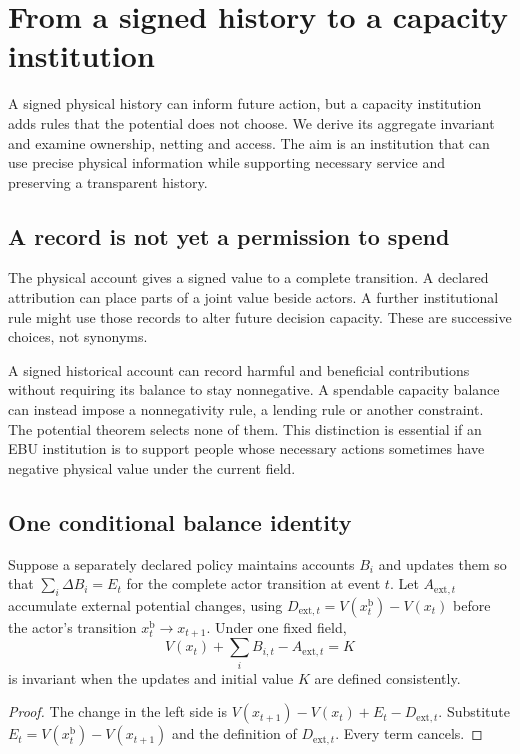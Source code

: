 \chapter{From a signed history to a capacity institution}\label{ch:institutions}

A signed physical history can inform future action, but a capacity institution adds rules that the potential does not choose. We derive its aggregate invariant and examine ownership, netting and access. The aim is an institution that can use precise physical information while supporting necessary service and preserving a transparent history.


\section{A record is not yet a permission to spend}
The physical account gives a signed value to a complete transition. A declared attribution can place parts of a joint value beside actors. A further institutional rule might use those records to alter future decision capacity. These are successive choices, not synonyms.

A signed historical account can record harmful and beneficial contributions without requiring its balance to stay nonnegative. A spendable capacity balance can instead impose a nonnegativity rule, a lending rule or another constraint. The potential theorem selects none of them. This distinction is essential if an EBU institution is to support people whose necessary actions sometimes have negative physical value under the current field.

\section{One conditional balance identity}
Suppose a separately declared policy maintains accounts $B_i$ and updates them so that $\sum_i\Delta B_i=E_t$ for the complete actor transition at event $t$. Let $A_{{\mathrm{ext}},t}$ accumulate external potential changes, using
$D_{{\mathrm{ext}},t}=V(x^{\mathrm{b}}_t)-V(x_t)$ before the actor's transition $x^{\mathrm{b}}_t\to x_{t+1}$. Under one fixed field,
\begin{equation}\label{eq:capacity-invariant}
 V(x_t)+\sum_iB_{i,t}-A_{{\mathrm{ext}},t}=K
\end{equation}
is invariant when the updates and initial value $K$ are defined consistently.

\begin{proof}
The change in the left side is
$V(x_{t+1})-V(x_t)+E_t-D_{{\mathrm{ext}},t}$.
Substitute $E_t=V(x^{\mathrm{b}}_t)-V(x_{t+1})$ and the definition of $D_{{\mathrm{ext}},t}$. Every term cancels.
\end{proof}

